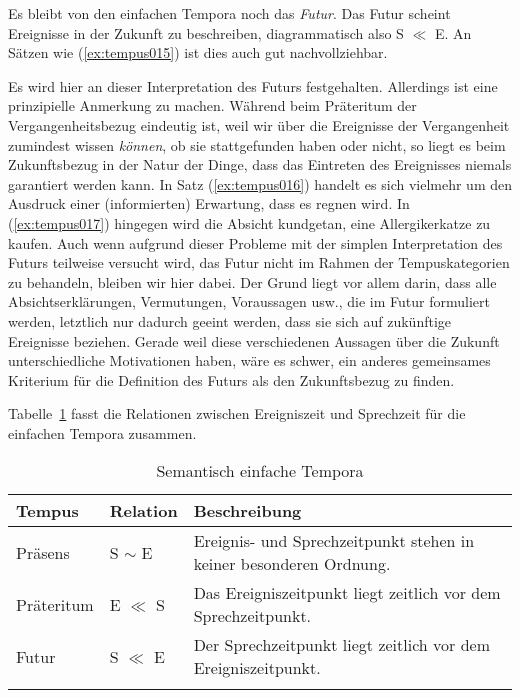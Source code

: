 
Es bleibt von den einfachen Tempora noch das \textit{Futur}.
Das Futur scheint Ereignisse in der Zukunft zu beschreiben, diagrammatisch also S $\ll$ E.
An Sätzen wie (\ref{ex:tempus015}) ist dies auch gut nachvollziehbar.

\begin{exe}
  \ex\label{ex:tempus015}
  \begin{xlist}
  \end{xlist}
\end{exe}

Es wird hier an dieser Interpretation des Futurs festgehalten.
Allerdings ist eine prinzipielle Anmerkung zu machen.
Während beim Präteritum der Vergangenheitsbezug eindeutig ist, weil wir über die Ereignisse der Vergangenheit zumindest wissen \textit{können}, ob sie stattgefunden haben oder nicht, so liegt es beim Zukunftsbezug in der Natur der Dinge, dass das Eintreten des Ereignisses niemals garantiert werden kann.
In Satz (\ref{ex:tempus016}) handelt es sich vielmehr um den Ausdruck einer (informierten) Erwartung, dass es regnen wird.
In (\ref{ex:tempus017}) hingegen wird die Absicht kundgetan, eine Allergikerkatze zu kaufen.
Auch wenn aufgrund dieser Probleme mit der simplen Interpretation des Futurs teilweise versucht wird, das Futur nicht im Rahmen der Tempuskategorien zu behandeln, bleiben wir hier dabei.
Der Grund liegt vor allem darin, dass alle Absichtserklärungen, Vermutungen, Voraussagen usw., die im Futur formuliert werden, letztlich nur dadurch geeint werden, dass sie sich auf zukünftige Ereignisse beziehen.
Gerade weil diese verschiedenen Aussagen über die Zukunft unterschiedliche Motivationen haben, wäre es schwer, ein anderes gemeinsames Kriterium für die Definition des Futurs als den Zukunftsbezug zu finden.

Tabelle~\ref{tab:tempus018} fasst die Relationen zwischen Ereigniszeit und Sprechzeit für die einfachen Tempora zusammen.

\begin{table}[!htbp]
  \centering
  \begin{tabular}{llp{6cm}}
    \lsptoprule
    \textbf{Tempus} & \textbf{Relation} & \textbf{Beschreibung} \\
    \midrule
    Präsens & S $\sim$ E & Ereignis- und Sprechzeitpunkt stehen in keiner besonderen Ordnung. \\
    Präteritum & E $\ll$ S & Das Ereigniszeitpunkt liegt zeitlich vor dem Sprechzeitpunkt. \\
    Futur & S $\ll$ E & Der Sprechzeitpunkt liegt zeitlich vor dem Ereigniszeitpunkt. \\
    \lspbottomrule
  \end{tabular}
  \caption{Semantisch einfache Tempora}
  \label{tab:tempus018}
\end{table}

